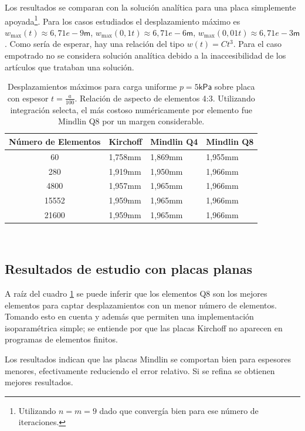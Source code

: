 \documentclass[onecolumn,10pt,titlepage]{article}
\newcommand{\unit}[1]{\textsf{#1}}
\newcommand{\milli}{\unit{m}}
\newcommand{\meter}{\unit{m}}
\newcommand{\pascal}{\unit{Pa}}
\newcommand{\kilo}{\unit{k}}
\newcommand{\si}[1]{#1}
\newcommand{\SI}[2]{#1\si{#2}}
\begin{document}
Los resultados se comparan con la solución analítica para una placa simplemente apoyada\citep{ugural2003advanced}\footnote{Utilizando $n=m=9$ dado que convergía bien para ese número de iteraciones.}. Para los casos estudiados el desplazamiento máximo es $w_{\max}(t)\approx \SI{6,71e-9}{\meter}$, $w_{\max}(0,1t)\approx \SI{6,71e-6}{\meter}$, $w_{\max}(0,01t)\approx \SI{6,71e-3}{\meter}$. Como sería de esperar, hay una relación del tipo $w(t)=Ct^3$. Para el caso empotrado no se considera solución analítica debido a la inaccesibilidad de los artículos que trataban una solución. 
\begin{table}[htb!] 
	\centering
	\begin{tabular}{clll}
		Número de Elementos& Kirchoff & Mindlin Q4 & Mindlin Q8  \\ \hline
		60  & \SI{1,758}{\milli \meter}  &  \SI{1,869}{\milli \meter}  & \SI{1,955}{\milli \meter} \\
		280  & \SI{1,919}{\milli \meter}  &  \SI{1,950}{\milli \meter}  & \SI{1,966}{\milli \meter} \\
		4800 &\SI{1,957}{\milli \meter}  &   \SI{1,965}{\milli \meter} &\SI{1,966}{\milli \meter} \\
		15552 &  \SI{1,959}{\milli \meter}   &  \SI{1,965}{\milli \meter}  & \SI{1,966}{\milli \meter}\\
		21600&  \SI{1,959}{\milli \meter}& \SI{1,965}{\milli \meter}  & \SI{1,966}{\milli \meter}
	\end{tabular}\
	\caption{Desplazamientos máximos para carga uniforme $p=\SI{5}{\kilo \pascal}$ sobre placa con espesor $t=\frac{a}{100}$. Relación de aspecto de elementos 4:3. Utilizando integración selecta\citep{cook2007concepts}, el más costoso numéricamente por elemento fue Mindlin Q8 por un margen considerable.}
	\label{tab:Convergencia}
\end{table}



\subsection{Resultados de estudio con placas planas}
A raíz del cuadro \ref{tab:Convergencia} se puede inferir que los elementos Q8 son los mejores elementos para captar desplazamientos con un menor número de elementos. Tomando esto en cuenta y además que permiten una implementación isoparamétrica simple; se entiende por que las placas Kirchoff no aparecen en programas de elementos finitos.

Los resultados indican que las placas Mindlin se comportan bien para espesores menores, efectivamente reduciendo el error relativo. Si se refina se obtienen mejores resultados.
\end{document}

